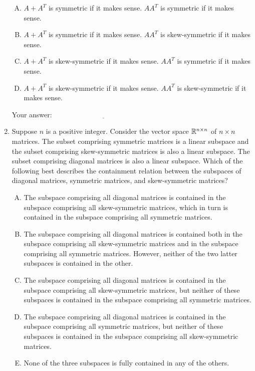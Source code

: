 \documentclass[10pt]{amsart}
\begin{document}
\begin{enumerate}
  \begin{enumerate}[(A)]
  \item $A + A^T$ is symmetric if it makes sense. $AA^T$ is symmetric
    if it makes sense.
  \item $A + A^T$ is symmetric if it makes sense. $AA^T$ is
    skew-symmetric if it makes sense.
  \item $A + A^T$ is skew-symmetric if it makes sense. $AA^T$ is
    symmetric if it makes sense.
  \item $A + A^T$ is skew-symmetric if it makes sense. $AA^T$ is
    skew-symmetric if it makes sense.
  \end{enumerate}

  \vspace{0.1in}
  Your answer: $\underline{\qquad\qquad\qquad\qquad\qquad\qquad\qquad}$
  \vspace{0.1in}

\item Suppose $n$ is a positive integer. Consider the vector space
  $\mathbb{R}^{n \times n}$ of $n \times n$ matrices. The subset comprising
  symmetric matrices is a linear subspace and the subset comprising
  skew-symmetric matrices is also a linear subspace. The subset
  comprising diagonal matrices is also a linear subspace. Which of the
  following best describes the containment relation between the
  subspaces of diagonal matrices, symmetric matrices, and
  skew-symmetric matrices?

  \begin{enumerate}[(A)]
  \item The subspace comprising all diagonal matrices is contained in
    the subspace comprising all skew-symmetric matrices, which in turn
    is contained in the subspace comprising all symmetric matrices.
  \item The subspace comprising all diagonal matrices is contained
    both in the subspace comprising all skew-symmetric matrices and in
    the subspace comprising all symmetric matrices. However, neither
    of the two latter subspaces is contained in the other.
  \item The subspace comprising all diagonal matrices is contained in
    the subspace comprising all skew-symmetric matrices, but neither
    of these subspaces is contained in the subspace comprising all
    symmetric matrices.
  \item The subspace comprising all diagonal matrices is contained in
    the subspace comprising all symmetric matrices, but neither
    of these subspaces is contained in the subspace comprising all
    skew-symmetric matrices.
  \item None of the three subspaces is fully contained in any of the
    others.
  \end{enumerate}


\end{enumerate}
\end{document}
